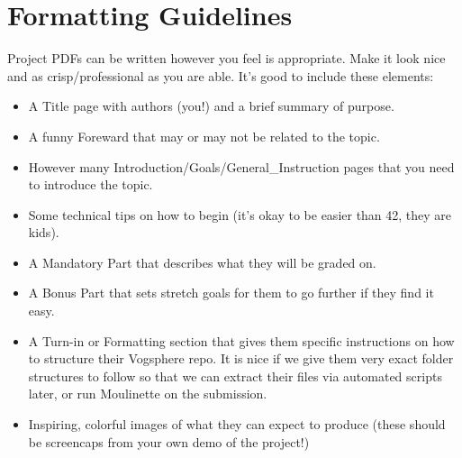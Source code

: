 \documentclass{42-en}
\begin{document}

\chapter{Formatting Guidelines}

Project PDFs can be written however you feel is appropriate. Make it look nice and as crisp/professional as you are able. It's good to include these elements:

\begin{itemize}
	\item A Title page with authors (you!) and a brief summary of purpose.
	\item A funny Foreward that may or may not be related to the topic.
	\item However many Introduction/Goals/General\_Instruction pages that you need to introduce the topic.
	\item Some technical tips on how to begin (it's okay to be easier than 42, they are kids).
	\item A Mandatory Part that describes what they will be graded on.
	\item A Bonus Part that sets stretch goals for them to go further if they find it easy.
	\item A Turn-in or Formatting section that gives them specific instructions on how to structure their Vogsphere repo. It is nice if we give them very exact folder structures to follow so that we can extract their files via automated scripts later, or run Moulinette on the submission.
	\item Inspiring, colorful images of what they can expect to produce (these should be screencaps from your own demo of the project!)
\end{itemize} 

\end{document}
